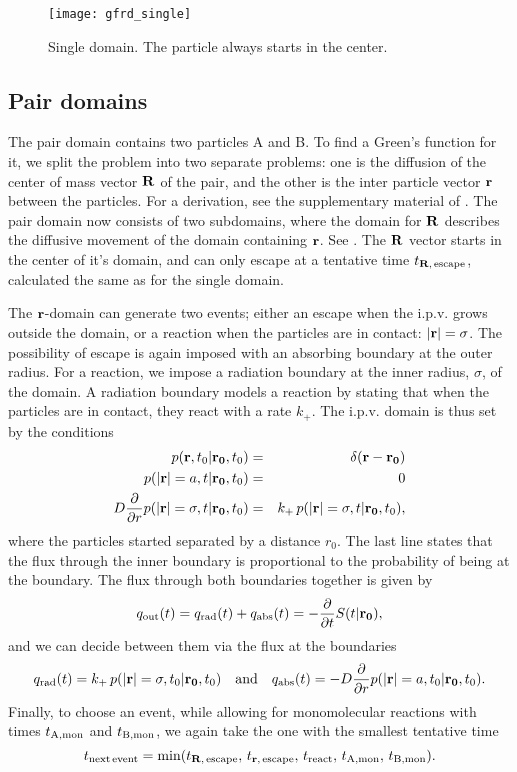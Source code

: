 \begin{figure}[ht]
\centering
\texttt{[image: gfrd\_single]}
\caption{ Single domain. The particle always starts in the center.}
\end{figure}


\subsection{Pair domains}
The pair domain contains two particles A and B. To find a Green's function for it, we split the problem into two separate problems: one is the diffusion of the center of mass vector ${\bf R}$ of the pair, and the other is the inter particle vector ${\bf r}$ between the particles. For a derivation, see the supplementary material of \cite{Takahashi2010}. The pair domain now consists of two subdomains, where the domain for ${\bf R}$ describes the diffusive movement of the domain containing ${\bf r}$. See . The ${\bf R}$ vector starts in the center of it's domain, and can only escape at a tentative time $t_{{\bf R},\,{\rm escape}}$, calculated the same as for the single domain. 

The ${\bf r}$-domain can generate two events; either an escape when the i.p.v. grows outside the domain, or a reaction when the particles are in contact: $|{\bf r}|=\sigma$. The possibility of escape is again imposed with an absorbing boundary at the outer radius. For a reaction, we impose a radiation boundary at the inner radius, $\sigma$, of the domain. A radiation boundary models a reaction by stating that when the particles are in contact, they react with a rate $k_+$. The i.p.v. domain is thus set by the conditions
\setlength{\jot}{10pt}
\begin{eqnarray}
 p({\bf r}, t_0|{\bf r_0},t_0) & = & \delta(\mathbf{r - r_0}) \\
 p({\bf |r|}=a, t|{\bf r_0},t_0) & = & 0 \\
 D \frac{\partial }{\partial r} p({\bf |r|}=\sigma, t|{\bf r_0},t_0) & = & k_+\,p({\bf |r|}=\sigma, t|{\bf r_0},t_0),
\end{eqnarray}
where the particles started separated by a distance $r_0$. The last line states that the flux through the inner boundary is proportional to the probability of being at the boundary. The flux through both boundaries together is given by
\begin{equation}
 q_{\rm out}(t) = q_{\rm rad}(t) + q_{\rm abs}(t) = -\frac{\partial }{\partial t} S(t|{\bf r_0}),
\end{equation}
and we can decide between them via the flux at the boundaries
\begin{equation}
q_{\rm rad}(t) = k_+ \, p({\bf |r|}=\sigma, t_0|{\bf r_0},t_0) \quad{\rm and}\quad q_{\rm abs}(t) = - D \frac{\partial }{\partial r} p({\bf |r|}=a, t_0|{\bf r_0},t_0).
\end{equation}
Finally, to choose an event, while allowing for monomolecular reactions with times $t_{\rm A, mon}$ and $t_{\rm B, mon}$, we again take the one with the smallest tentative time
\begin{equation}
 t_{\rm next\,event} = {\rm min}(t_{{\bf R},\,{\rm escape}},\,t_{{\bf r},\,{\rm escape}},\,t_{\rm react},\,t_{\rm A, mon},\,t_{\rm B, mon}).
\end{equation}

